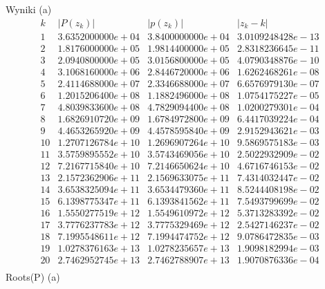 Wyniki (a)
$$
\begin{array}{c|c|c|c}
k & |P(z_k)| & |p(z_k)| & |z_k - k|\\
\hline
1 & 3.6352000000e+04 & 3.8400000000e+04 & 3.0109248428e-13\\
2 & 1.8176000000e+05 & 1.9814400000e+05 & 2.8318236645e-11\\
3 & 2.0940800000e+05 & 3.0156800000e+05 & 4.0790348876e-10\\
4 & 3.1068160000e+06 & 2.8446720000e+06 & 1.6262468261e-08\\
5 & 2.4114688000e+07 & 2.3346688000e+07 & 6.6576979130e-07\\
6 & 1.2015206400e+08 & 1.1882496000e+08 & 1.0754175227e-05\\
7 & 4.8039833600e+08 & 4.7829094400e+08 & 1.0200279301e-04\\
8 & 1.6826910720e+09 & 1.6784972800e+09 & 6.4417039224e-04\\
9 & 4.4653265920e+09 & 4.4578595840e+09 & 2.9152943621e-03\\
10 & 1.2707126784e+10 & 1.2696907264e+10 & 9.5869575183e-03\\
11 & 3.5759895552e+10 & 3.5743469056e+10 & 2.5022932909e-02\\
12 & 7.2167715840e+10 & 7.2146650624e+10 & 4.6716746153e-02\\
13 & 2.1572362906e+11 & 2.1569633075e+11 & 7.4314032447e-02\\
14 & 3.6538325094e+11 & 3.6534479360e+11 & 8.5244408198e-02\\
15 & 6.1398775347e+11 & 6.1393841562e+11 & 7.5493799699e-02\\
16 & 1.5550277519e+12 & 1.5549610972e+12 & 5.3713283392e-02\\
17 & 3.7776237783e+12 & 3.7775329469e+12 & 2.5427146237e-02\\
18 & 7.1995548611e+12 & 7.1994474752e+12 & 9.0786472835e-03\\
19 & 1.0278376163e+13 & 1.0278235657e+13 & 1.9098182994e-03\\
20 & 2.7462952745e+13 & 2.7462788907e+13 & 1.9070876336e-04\\
\end{array}
$$
Roots(P) (a)
